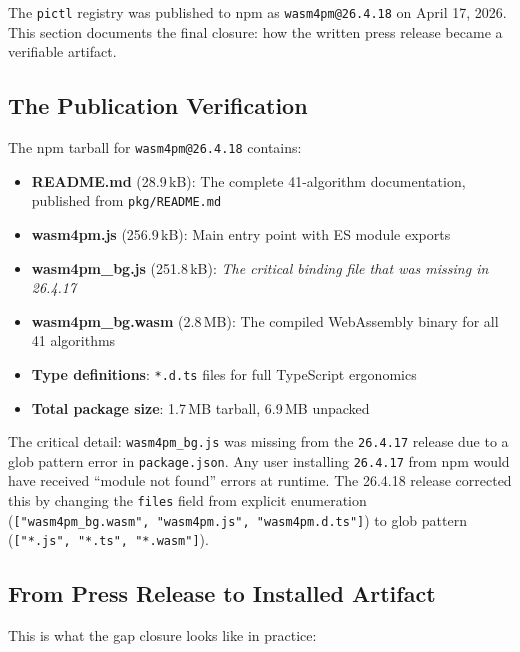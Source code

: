 \documentclass[11pt,a4paper]{article}
\newcommand{\code}[1]{\texttt{#1}}
\begin{document}
The \code{pictl} registry was published to npm as \code{wasm4pm@26.4.18} on April 17, 2026.
This section documents the final closure: how the written press release became a verifiable artifact.

\subsection{The Publication Verification}

The npm tarball for \code{wasm4pm@26.4.18} contains:

\begin{itemize}
  \item \textbf{README.md} (28.9\,kB): The complete 41-algorithm documentation, published from \code{pkg/README.md}
  \item \textbf{wasm4pm.js} (256.9\,kB): Main entry point with ES module exports
  \item \textbf{wasm4pm\_bg.js} (251.8\,kB): \textit{The critical binding file that was missing in 26.4.17}
  \item \textbf{wasm4pm\_bg.wasm} (2.8\,MB): The compiled WebAssembly binary for all 41 algorithms
  \item \textbf{Type definitions}: \code{*.d.ts} files for full TypeScript ergonomics
  \item \textbf{Total package size}: 1.7\,MB tarball, 6.9\,MB unpacked
\end{itemize}

The critical detail: \code{wasm4pm\_bg.js} was missing from the \code{26.4.17} release due to a glob pattern error in \code{package.json}. Any user installing \code{26.4.17} from npm would have received ``module not found'' errors at runtime. The 26.4.18 release corrected this by changing the \code{files} field from explicit enumeration (\code{["wasm4pm\_bg.wasm", "wasm4pm.js", "wasm4pm.d.ts"]}) to glob pattern (\code{["*.js", "*.ts", "*.wasm"]}).

\subsection{From Press Release to Installed Artifact}

This is what the gap closure looks like in practice:
\end{document}
